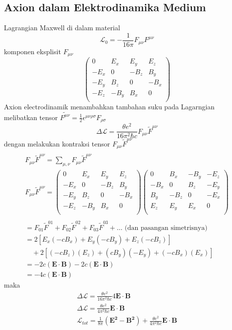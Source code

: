\subsection{Axion dalam Elektrodinamika Medium}
Lagrangian Maxwell di dalam material
$$
\mathcal{L}_{0} = - \frac{1}{16 \pi} F_{\mu \nu} F^{\mu \nu}
$$
komponen eksplisit $F_{\mu \nu}$
$$
\begin{pmatrix}
0 & E_{x} & E_{y} & E_{z} \\
-E_{x} & 0 & -B_{z} & B_{y} \\
-E_{y} & B_{z} & 0 & -B_{x} \\
-E_{z} & -B_{y} & B_{x} & 0 \\
\end{pmatrix}
$$
Axion electrodinamik menambahkan tambahan suku pada Lagarngian melibatkan tensor $\tilde{F^{\mu \nu}} = \frac{1}{2}\epsilon^{\mu \nu \rho \sigma} F_{\rho \sigma}$
$$
\Delta \mathcal{L}= \frac{\theta e^{2}}{16 \pi^{2}\hbar c}F_{\mu \nu}\tilde{F}^{\mu \nu}
$$
dengan melakukan kontraksi tensor $F_{\mu \nu}\tilde{F}^{\mu \nu}$ 
$$
\begin{align} \\
F_{\mu\nu}\tilde{F}^{\mu\nu} = \sum_{\mu,\nu} F_{\mu\nu}\tilde{F}^{\mu\nu} \\
F_{\mu \nu}\tilde{F}^{\mu \nu} = \begin{pmatrix}
0 & E_{x} & E_{y} & E_{z} \\
-E_{x} & 0 & -B_{z} & B_{y} \\
-E_{y} & B_{z} & 0 & -B_{x} \\
-E_{z} & -B_{y} & B_{x} & 0 \\
\end{pmatrix} \begin{pmatrix}
0 & B_{x} & -B_{y} & -E_{z} \\
-B_{x} & 0 & B_{z} & -E_{y} \\
B_{y} & -B_{z} & 0 & -E_{x} \\
E_{z} & E_{y} & E_{x} & 0 \\
\end{pmatrix} \\ \\
= F_{01}\tilde{F}^{01} + F_{02}\tilde{F}^{02} + F_{03}\tilde{F}^{03} + \dots \text{ (dan pasangan simetrisnya)} \nonumber \\
= 2 \left[ E_x(-cB_x) + E_y(-cB_y) + E_z(-cB_z) \right] \nonumber \\
 \quad + 2 \left[ (-cB_z)(E_z) + (cB_y)(-E_y) + (-cB_x)(E_x) \right] \nonumber \\
= -2c(\mathbf{E} \cdot \mathbf{B}) - 2c(\mathbf{E} \cdot \mathbf{B}) \nonumber \\
= -4c(\mathbf{E} \cdot \mathbf{B})
\end{align}
$$
maka
$$
\begin{align}
\Delta \mathcal{L} = \frac{\theta e^{2}}{16 \pi^{2}\hbar c}4\mathbf{E \cdot B} \\
\Delta \mathcal{L} = \frac{\theta e^{2}}{4 \pi^{2}\hbar c}\mathbf{E \cdot B} \\
\mathcal{L}_{tot} = \frac{1}{8 \pi}(\mathbf{E^{2} - B^{2}}) + \frac{\theta e^{2}}{4 \pi^{2}\hbar c}\mathbf{E \cdot B}
\end{align}
$$

